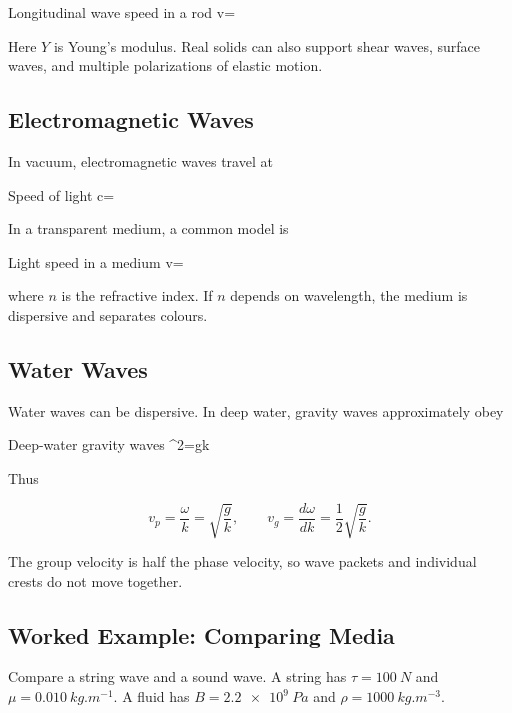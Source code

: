 \documentclass{studentnotes}
\begin{document}
\begin{namedformula}{Longitudinal wave speed in a rod}
    v=
\end{namedformula}

Here \(Y\) is Young's modulus. Real solids can also support shear waves, surface
waves, and multiple polarizations of elastic motion.

\subsection{Electromagnetic Waves}

In vacuum, electromagnetic waves travel at

\begin{namedformula}{Speed of light}
    c=
\end{namedformula}

In a transparent medium, a common model is

\begin{namedformula}{Light speed in a medium}
    v=
\end{namedformula}

where \(n\) is the refractive index. If \(n\) depends on wavelength, the medium
is dispersive and separates colours.

\subsection{Water Waves}

Water waves can be dispersive. In deep water, gravity waves approximately obey

\begin{namedformula}{Deep-water gravity waves}
    \omega^2=gk
\end{namedformula}

Thus

\[
    v_p=\frac{\omega}{k}=\sqrt{\frac{g}{k}},
    \qquad
    v_g=\frac{d\omega}{dk}=\frac{1}{2}\sqrt{\frac{g}{k}}.
\]

The group velocity is half the phase velocity, so wave packets and individual
crests do not move together.

\subsection{Worked Example: Comparing Media}

Compare a string wave and a sound wave. A string has
\(\tau=\SI{100}{N}\) and \(\mu=\SI{0.010}{kg.m^{-1}}\). A fluid has
\(B=\SI{2.2e9}{Pa}\) and \(\rho=\SI{1000}{kg.m^{-3}}\).
\end{document}
